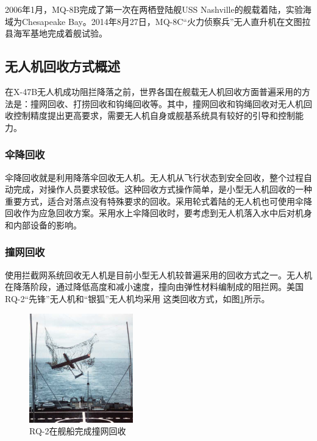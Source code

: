 2006年1月，MQ-8B完成了第一次在两栖登陆舰USS Nashville的舰载着陆，实验海域为Chesapeake Bay。2014年8月27日，MQ-8C“火力侦察兵”无人直升机在文图拉县海军基地完成着舰试验。

\subsection{无人机回收方式概述}
在X-47B无人机成功阻拦降落之前，世界各国在舰载无人机回收方面普遍采用的方法是：撞网回收、打捞回收和钩绳回收等。其中，撞网回收和钩绳回收对无人机回收控制精度提出更高要求，需要无人机自身或舰基系统具有较好的引导和控制能力。

\subsubsection{伞降回收}
伞降回收就是利用降落伞回收无人机。无人机从飞行状态到安全回收，整个过程自动完成，对操作人员要求较低。这种回收方式操作简单，是小型无人机回收的一种重要方式，适合对落点没有特殊要求的回收。采用轮式着陆的无人机也可使用伞降回收作为应急回收方案。采用水上伞降回收时，要考虑到无人机落入水中后对机身和内部设备的影响。

\subsubsection{撞网回收}
使用拦截网系统回收无人机是目前小型无人机较普遍采用的回收方式之一。无人机在降落阶段，通过降低高度和减小速度，撞向由弹性材料编制成的阻拦网。美国RQ-2“先锋”无人机和“银狐”无人机均采用
这类回收方式，如图\ref{fig:34_RQ2_Pioneer_Landing}所示。
\begin{figure}[!tb]   
	\centering	
	\includegraphics[width=0.4\textwidth]{Figs/34_RQ2_Pioneer_Landing.jpg}
	\caption{RQ-2在舰船完成撞网回收}
	\label{fig:34_RQ2_Pioneer_Landing}
\end{figure}


